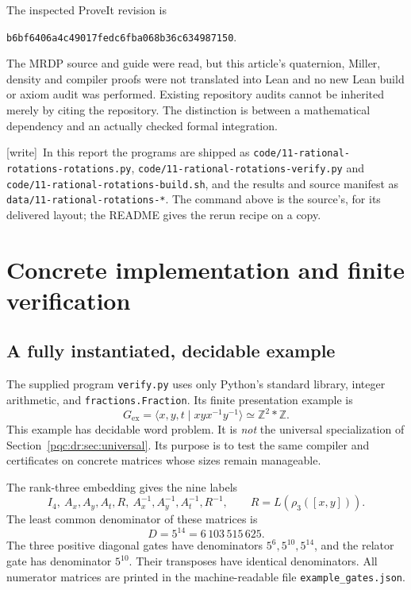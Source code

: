 \documentclass[11pt,letterpaper]{article}
\numberwithin{equation}{section}
\theoremstyle{definition}
\theoremstyle{remark}
\newcommand{\Z}{\mathbb Z}
\newcommand{\code}[1]{\nolinkurl{#1}}
\newcommand{\wtag}{\textup{[write]}}
\newcommand{\srcmark}[1]{\par\noindent{\small\itshape [source~#1]}\par}
\newcommand{\pres}[2]{\langle #1\mid #2\rangle}
\begin{document}
The inspected ProveIt revision is
\begin{center}
\small\texttt{b6bf6406a4c49017fedc6fba068b36c634987150}.
\end{center}
The MRDP source and guide were read, but this article's quaternion,
Miller, density and compiler proofs were not translated into Lean and no
new Lean build or axiom audit was performed. Existing repository audits
cannot be inherited merely by citing the repository. The distinction is
between a mathematical dependency and an actually checked formal
integration.

\wtag\ In this report the programs are shipped as
\code{code/11-rational-rotations-rotations.py},
\code{code/11-rational-rotations-verify.py} and
\code{code/11-rational-rotations-build.sh}, and the results and source
manifest as \code{data/11-rational-rotations-*}. The command above is the
source's, for its delivered layout; the README gives the rerun recipe on a
copy.
\section{Concrete implementation and finite verification}
\label{pqc:dr:sec:verification}
\srcmark{16}

\subsection{A fully instantiated, decidable example}
The supplied program \code{verify.py} uses only Python's standard
library, integer arithmetic, and \code{fractions.Fraction}. Its finite
presentation example is
\begin{equation}
 G_{\mathrm{ex}}=\pres{x,y,t}{xyx^{-1}y^{-1}}
 \simeq\Z^2*\Z.
 \label{pqc:dr:eq:example}
\end{equation}
This example has decidable word problem. It is \emph{not} the universal
specialization of Section~\ref{pqc:dr:sec:universal}. Its purpose is to test the
same compiler and certificates on concrete matrices whose sizes remain
manageable.

The rank-three embedding gives the nine labels
\[
 I_4,\ A_x,A_y,A_t,R,\ A_x^{-1},A_y^{-1},A_t^{-1},R^{-1},
 \qquad R=L(\rho_3([x,y])).
\]
The least common denominator of these matrices is
\begin{equation}
 D=5^{14}=6\,103\,515\,625.
 \label{pqc:dr:eq:exampleD}
\end{equation}
The three positive diagonal gates have denominators $5^6,5^{10},5^{14}$,
and the relator gate has denominator $5^{10}$. Their transposes have
identical denominators. All numerator matrices are printed in the
machine-readable file \code{example_gates.json}.
\end{document}
